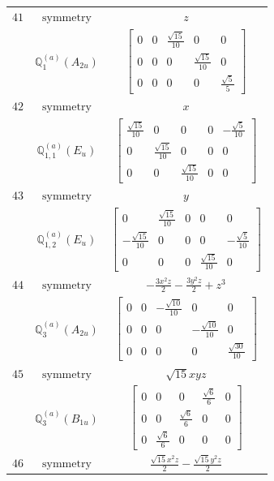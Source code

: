 \documentclass[fleqn,8pt,landscape]{jsarticle}
\begin{document}
\begin{longtable}{ccc}
$ 41 $ & $ \text{symmetry} $ & $ z $ \\
$  $ & $ \mathbb{Q}_{1}^{(a)}(A_{2u}) $ & $ \begin{bmatrix} 0 & 0 & \frac{\sqrt{15}}{10} & 0 & 0 \\ 0 & 0 & 0 & \frac{\sqrt{15}}{10} & 0 \\ 0 & 0 & 0 & 0 & \frac{\sqrt{5}}{5} \end{bmatrix} $ \\ \hline
$ 42 $ & $ \text{symmetry} $ & $ x $ \\
$  $ & $ \mathbb{Q}_{1,1}^{(a)}(E_{u}) $ & $ \begin{bmatrix} \frac{\sqrt{15}}{10} & 0 & 0 & 0 & - \frac{\sqrt{5}}{10} \\ 0 & \frac{\sqrt{15}}{10} & 0 & 0 & 0 \\ 0 & 0 & \frac{\sqrt{15}}{10} & 0 & 0 \end{bmatrix} $ \\ \hline
$ 43 $ & $ \text{symmetry} $ & $ y $ \\
$  $ & $ \mathbb{Q}_{1,2}^{(a)}(E_{u}) $ & $ \begin{bmatrix} 0 & \frac{\sqrt{15}}{10} & 0 & 0 & 0 \\ - \frac{\sqrt{15}}{10} & 0 & 0 & 0 & - \frac{\sqrt{5}}{10} \\ 0 & 0 & 0 & \frac{\sqrt{15}}{10} & 0 \end{bmatrix} $ \\ \hline
$ 44 $ & $ \text{symmetry} $ & $ - \frac{3 x^{2} z}{2} - \frac{3 y^{2} z}{2} + z^{3} $ \\
$  $ & $ \mathbb{Q}_{3}^{(a)}(A_{2u}) $ & $ \begin{bmatrix} 0 & 0 & - \frac{\sqrt{10}}{10} & 0 & 0 \\ 0 & 0 & 0 & - \frac{\sqrt{10}}{10} & 0 \\ 0 & 0 & 0 & 0 & \frac{\sqrt{30}}{10} \end{bmatrix} $ \\ \hline
$ 45 $ & $ \text{symmetry} $ & $ \sqrt{15} x y z $ \\
$  $ & $ \mathbb{Q}_{3}^{(a)}(B_{1u}) $ & $ \begin{bmatrix} 0 & 0 & 0 & \frac{\sqrt{6}}{6} & 0 \\ 0 & 0 & \frac{\sqrt{6}}{6} & 0 & 0 \\ 0 & \frac{\sqrt{6}}{6} & 0 & 0 & 0 \end{bmatrix} $ \\ \hline
$ 46 $ & $ \text{symmetry} $ & $ \frac{\sqrt{15} x^{2} z}{2} - \frac{\sqrt{15} y^{2} z}{2} $ \\

\end{longtable}
\end{document}
